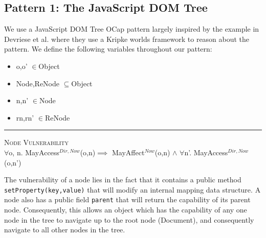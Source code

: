 \documentclass[a4paper,11pt, twoside,twocolumn]{article}
\newenvironment{logic}[1][]
{\begin{flushleft} \small }
{\end{flushleft}}
\newcommand{\loin}{$\in$}
\newcommand{\loforall}{$\forall$}
\newcommand{\loand}{$\land$}
\newcommand{\losubseteq}{$\subseteq$}
\newcommand{\loimplies}{$\implies$}
\newcommand{\ablock} {\null\qquad}
\begin{document}
{\subsection{Pattern 1: The JavaScript DOM Tree}
We use a JavaScript DOM Tree OCap pattern largely inspired by the example in Devriese et al.\cite{devriese2016} where they use a Kripke worlds framework to reason about the pattern. We define the following variables throughout our pattern:
\begin{itemize}
\item o,o' \loin Object
\item Node,ReNode \losubseteq Object
\item n,n' \loin Node
\item rn,rn' \loin ReNode
\end{itemize}

\begin{logic}[NodeVul]
\hrule\null
\textsc{\normalsize *Node Vulnerability}\\
\loforall o, n. MayAccess$^{Dir,Now}$(o,n)\linebreak \ablock\ablock \loimplies \linebreak
\ablock \ablock MayAffect$^{Now}$(o,n) \loand \linebreak
\ablock \ablock \loforall n'. MayAccess$^{Dir,Now}$(o,n')
\end{logic}
The vulnerability of a node lies in the fact that it contains a public method \texttt{setProperty(key,value)} that will modify an internal mapping data structure. A node also has a public field \texttt{parent} that will return the capability of its parent node. Consequently, this allows an object which has the capability of any one node in the tree to navigate up to the root node (Document), and consequently navigate to all other nodes in the tree.


\small



\end{document}
